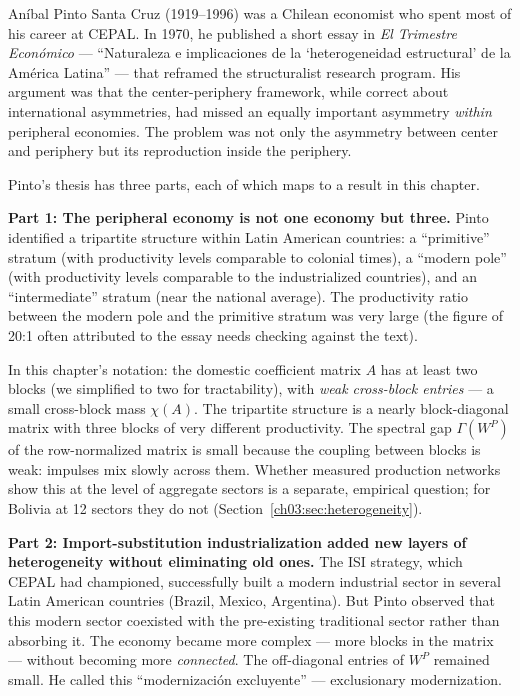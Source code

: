 \documentclass[../structural_economics_book.tex]{subfiles}
\begin{document}
An\'{i}bal Pinto Santa Cruz (1919--1996) was a Chilean economist who spent most of his career at CEPAL. In 1970, he published a short essay in \textit{El Trimestre Econ\'{o}mico} --- ``Naturaleza e implicaciones de la `heterogeneidad estructural' de la Am\'{e}rica Latina'' --- that reframed the structuralist research program. His argument was that the center-periphery framework, while correct about international asymmetries, had missed an equally important asymmetry \textit{within} peripheral economies. The problem was not only the asymmetry between center and periphery but its reproduction inside the periphery.

Pinto's thesis has three parts, each of which maps to a result in this chapter.

\textbf{Part 1: The peripheral economy is not one economy but three.} Pinto identified a tripartite structure within Latin American countries: a ``primitive'' stratum (with productivity levels comparable to colonial times), a ``modern pole'' (with productivity levels comparable to the industrialized countries), and an ``intermediate'' stratum (near the national average). The productivity ratio between the modern pole and the primitive stratum was very large (the figure of 20:1 often attributed to the essay needs checking against the text).

In this chapter's notation: the domestic coefficient matrix $A$ has at least two blocks (we simplified to two for tractability), with \textit{weak cross-block entries} --- a small cross-block mass $\chi(A)$. The tripartite structure is a nearly block-diagonal matrix with three blocks of very different productivity. The spectral gap $\Gamma(W^P)$ of the row-normalized matrix is small because the coupling between blocks is weak: impulses mix slowly across them. Whether measured production networks show this at the level of aggregate sectors is a separate, empirical question; for Bolivia at 12 sectors they do not (Section~\ref{ch03:sec:heterogeneity}).

\textbf{Part 2: Import-substitution industrialization added new layers of heterogeneity without eliminating old ones.} The ISI strategy, which CEPAL had championed, successfully built a modern industrial sector in several Latin American countries (Brazil, Mexico, Argentina). But Pinto observed that this modern sector coexisted with the pre-existing traditional sector rather than absorbing it. The economy became more complex --- more blocks in the matrix --- without becoming more \textit{connected}. The off-diagonal entries of $W^P$ remained small. He called this ``modernizaci\'{o}n excluyente'' --- exclusionary modernization.
\end{document}

